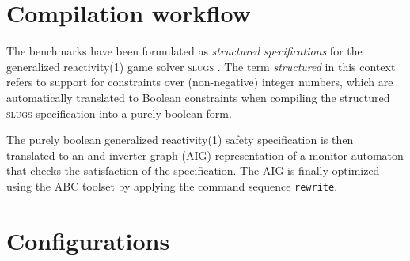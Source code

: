 \documentclass[a4paper,10pt]{IEEEtran}
\begin{document}
\section{Compilation workflow}

\noindent The benchmarks have been formulated as \emph{structured specifications} for the generalized reactivity(1) game solver \textsc{slugs} \cite{SlugsReference}. The term \emph{structured} in this context refers to support for constraints over (non-negative) integer numbers, which are automatically translated to Boolean constraints when compiling the structured \textsc{slugs} specification into a purely boolean form.

The purely boolean generalized reactivity(1) safety specification is then translated to an and-inverter-graph (AIG) representation of a monitor automaton that checks the satisfaction of the specification. The AIG is finally optimized using the ABC toolset \cite{ABCTool} by applying the command sequence \texttt{rewrite}.


\section{Configurations}
\end{document}
